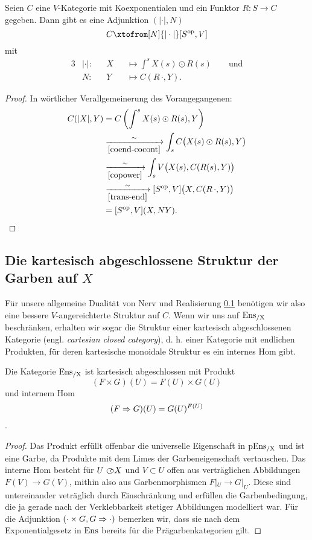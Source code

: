 \begin{theorem} 
  Seien $C$ eine $V$-Kategorie mit Koexponentialen und ein Funktor $R:
  S \to C$ gegeben. Dann gibt es eine Adjunktion $(|\cdot|, N)$  
  \[ C \xtofrom[N]{|\cdot|} [S\op, V] \]
  mit
  \begin{alignat*}{3}
    &|\cdot|: && X &&\mapsto \int^s X(s) \odot R(s) \qquad \text{und} \\
    &N: && Y &&\mapsto C(R \, \cdot, Y).
  \end{alignat*}
\end{theorem}
\begin{proof}
  In wörtlicher Verallgemeinerung des Vorangegangenen:
  \begin{align*}
     C(|X|, Y)
     &= C \left( \int^s X(s) \odot R(s), Y \right) \\
     & \xrightarrow[\ref{coend-cocont}]{\sim}
       \int_s C \big( X(s) \odot R(s), Y \big) \\
     & \xrightarrow[\ref{copower}]{\sim}
       \int_s V \big( X(s), C(R(s), Y) \big) \\
     & \xrightarrow[\ref{trans-end}]{\sim}
       [S^\mathrm{op}, V] \big( X, C(R \, \cdot, Y) \big) \\
     &= [S^\mathrm{op}, V] (X, NY).
  \end{align*}
\end{proof}


\subsection{Die kartesisch abgeschlossene Struktur der Garben auf $X$}

Für unsere allgemeine Dualität von Nerv und Realisierung \ref{}
benötigen wir also eine bessere $V$-angereichterte Struktur auf
$C$. Wenn wir uns auf $\operatorname{Ens_{/X}}$ beschränken, erhalten wir sogar die
Struktur einer kartesisch abgeschlossenen Kategorie
(engl. \emph{cartesian closed category}), d. h. einer Kategorie mit
endlichen Produkten, für deren kartesische monoidale Struktur es ein
internes Hom gibt.

\begin{prop}
  Die Kategorie $\operatorname{Ens_{/X}}$ ist kartesisch abgeschlossen mit Produkt
  \[ (F \times G)(U) = F(U) \times G(U) \]
  und internem Hom
  \[ (F \Rightarrow G)(U) = G(U)^{F(U)} \].
\end{prop}
\begin{proof}
  Das Produkt erfüllt offenbar die universelle Eigenschaft in $\operatorname{pEns_{/X}}$
  und ist eine Garbe, da Produkte mit dem Limes der Garbeneigenschaft
  vertauschen. Das interne Hom besteht für $U \subset\kern-0.58em\circ X$ und $V \subset
  U$ offen aus verträglichen Abbildungen $F(V) \to G(V)$, mithin also
  aus Garbenmorphismen $F|_U \to G|_U$. Diese sind untereinander
  veträglich durch Einschränkung und erfüllen die Garbenbedingung, die
  ja gerade nach der Verklebbarkeit stetiger Abbildungen modelliert
  war. Für die Adjunktion $(\cdot \times G, G \Rightarrow \cdot)$
  bemerken wir, dass sie nach dem Exponentialgesetz in $\operatorname{Ens}$ bereits
  für die Prägarbenkategorien gilt.
\end{proof}




